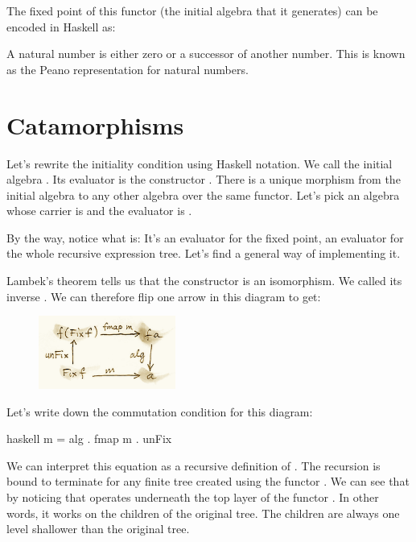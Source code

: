 The fixed point of this functor (the initial algebra that it generates)
can be encoded in Haskell as:

A natural number is either zero or a successor of another number. This
is known as the Peano representation for natural numbers.

\section{Catamorphisms}

Let's rewrite the initiality condition using Haskell notation. We call
the initial algebra . Its evaluator is the constructor
. There is a unique morphism  from the initial
algebra to any other algebra over the same functor. Let's pick an
algebra whose carrier is  and the evaluator is .

\begin{figure}[H]
\centering
{}
\end{figure}

\noindent
By the way, notice what  is: It's an evaluator for the fixed
point, an evaluator for the whole recursive expression tree. Let's find
a general way of implementing it.

Lambek's theorem tells us that the constructor  is an
isomorphism. We called its inverse . We can therefore flip
one arrow in this diagram to get:

\begin{figure}[H]
\centering
\includegraphics[width=0.4\textwidth]{images/alg6.png}
\end{figure}

\noindent
Let's write down the commutation condition for this diagram:

\begin{snip}{haskell}
m = alg . fmap m . unFix
\end{snip}
We can interpret this equation as a recursive definition of .
The recursion is bound to terminate for any finite tree created using
the functor . We can see that by noticing that
 operates underneath the top layer of the functor
. In other words, it works on the children of the original
tree. The children are always one level shallower than the original
tree.

